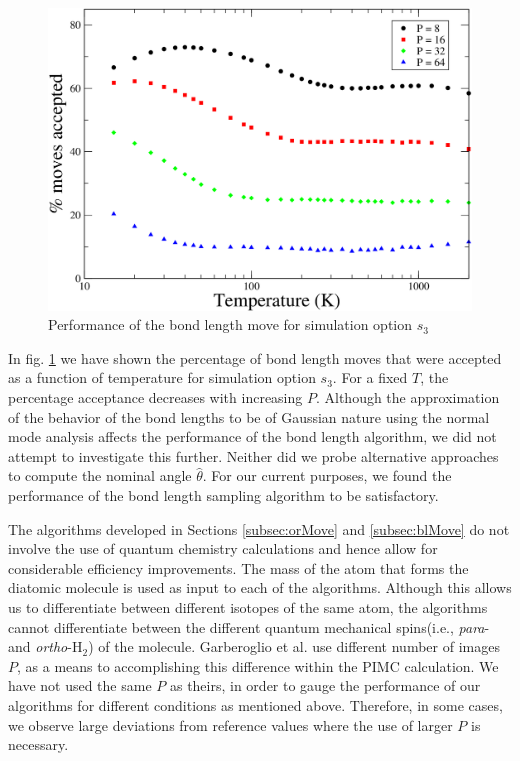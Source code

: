                 \begin{figure}[!htbp]
                    \centering
                    \includegraphics[scale=0.20,keepaspectratio]{Chapter-4/Figures/s3BlAcc.png}
                    \caption{Performance of the bond length move for simulation option $s_3$}
                    \label{fig:variableBlAcc}
                \end{figure}

                In fig. \ref{fig:variableBlAcc} we have shown the percentage of bond length moves that were accepted as a function of temperature for simulation option $s_3$. For a fixed $T$, the percentage acceptance decreases with increasing $P$. Although the approximation of the behavior of the bond lengths to be of Gaussian nature using the normal mode analysis affects the performance of the bond length algorithm, we did not attempt to investigate this further. Neither did we probe alternative approaches to compute the nominal angle $\hat \theta$. For our current purposes, we found the performance of the bond length sampling algorithm to be satisfactory.

                The algorithms developed in Sections \ref{subsec:orMove} and \ref{subsec:blMove} do not involve the use of quantum chemistry calculations and hence allow for considerable efficiency improvements. The mass of the atom that forms the diatomic molecule is used as input to each of the algorithms. Although this allows us to differentiate between different isotopes of the same atom, the algorithms cannot differentiate between the different quantum mechanical spins(i.e., \emph{para}- and \emph{ortho}-H$_2$) of the molecule. Garberoglio et al. \cite{Garberoglio2014} use different number of images $P$, as a means to accomplishing this difference within the PIMC calculation. We have not used the same $P$ as theirs, in order to gauge the performance of our algorithms for different conditions as mentioned above. Therefore, in some cases, we observe large deviations from reference values where the use of larger $P$ is necessary.

